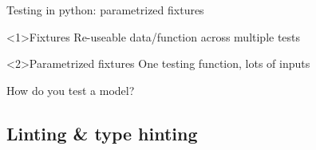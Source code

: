 \documentclass[t]{beamer}
\begin{document}
\begin{frame}{Testing in python: parametrized fixtures}
    \begin{block}<1>{Fixtures}
        Re-useable data/function across multiple tests
    \end{block}

    \begin{block}<2>{Parametrized fixtures}
        One testing function, lots of inputs
    \end{block}
\end{frame}

\begin{frame}{How do you test a model?}

\end{frame}

\subsection{Linting \& type hinting}
\end{document}
